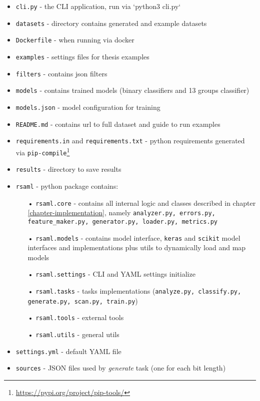 \begin{itemize}

\item \texttt{cli.py} - the CLI application, run via `python3 cli.py`
\item \texttt{datasets} - directory contains generated and example datasets
\item \texttt{Dockerfile} - when running via docker
\item \texttt{examples} - settings files for thesis examples
\item \texttt{filters} - contains json filters
\item \texttt{models} - contains trained models (binary classifiers and 13 groups classifier)
\item \texttt{models.json} - model configuration for training
\item \texttt{README.md} - contains url to full dataset and guide to run examples
\item \texttt{requirements.in} and \texttt{requirements.txt} - python requirements generated via \texttt{pip-compile}\footnote{\url{https://pypi.org/project/pip-tools/}}
\item \texttt{results} - directory to save results
\item \texttt{rsaml} - python package contains:
\begin{itemize}
\item[•] \texttt{rsaml.core} - contains all internal logic and classes described in chapter \ref{chapter-implementation}, namely \texttt{analyzer.py, errors.py, feature\_maker.py, generator.py, loader.py, metrics.py}
\item[•] \texttt{rsaml.models} - contains model interface, \texttt{keras} and \texttt{scikit} model interfaces and implementations plus utils to dynamically load and map models
\item[•] \texttt{rsaml.settings} - CLI and YAML settings initialize
\item[•] \texttt{rsaml.tasks} - tasks implementations (\texttt{analyze.py, classify.py, generate.py, scan.py, train.py})
\item[•] \texttt{rsaml.tools} - external tools
\item[•] \texttt{rsaml.utils} - general utils
\end{itemize}
\item \texttt{settings.yml} - default YAML file
\item \texttt{sources} - JSON files used by \textit{generate} task (one for each bit length)

\end{itemize}


